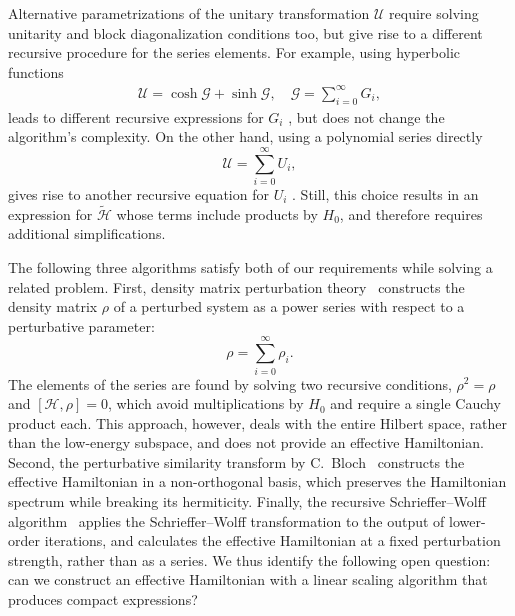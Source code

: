 Alternative parametrizations of the unitary transformation $\mathcal{U}$ require solving unitarity and block diagonalization conditions too, but give rise to a different recursive procedure for the series elements.
For example, using hyperbolic functions
%
\begin{gather}
\mathcal{U} = \cosh{\mathcal{G}} + \sinh{\mathcal{G}}, \quad
\mathcal{G} = \sum_{i=0}^{\infty} G_i,
\end{gather}
%
leads to different recursive expressions for $G_i$ \cite{Shavitt_1980}, but does not change the algorithm's complexity.
On the other hand, using a polynomial series directly
%
\begin{equation}
\mathcal{U} = \sum_{i=0}^{\infty} U_i,
\end{equation}
%
gives rise to another recursive equation for $U_i$ \cite{Van_Vleck_1929, Lowdin_1962, Klein_1974, Suzuki_1983}.
Still, this choice results in an expression for $\tilde{\mathcal{H}}$ whose terms include products by $H_0$, and therefore requires additional simplifications.

The following three algorithms satisfy both of our requirements while solving a related problem.
First, density matrix perturbation theory~\cite{McWeeny_1962,McWeeny_1968,Truflandier_2020} constructs the density
matrix $\mathcal{\rho}$ of a perturbed system as a power series with respect to a perturbative parameter:
%
\begin{equation}
  \mathcal{\rho} = \sum_{i=0}^{\infty} \rho_i.
\end{equation}
%
The elements of the series are found by solving two recursive conditions, $\mathcal{\rho}^2 = \mathcal{\rho}$ and $[\mathcal{H}, \mathcal{\rho}]=0$, which avoid multiplications by $H_0$ and require a single Cauchy product each.
This approach, however, deals with the entire Hilbert space, rather than the low-energy subspace, and does not provide an effective Hamiltonian.
Second, the perturbative similarity transform by C.~Bloch~\cite{Bloch_1958,Bravyi_2011} constructs the effective Hamiltonian in a non-orthogonal basis, which preserves the Hamiltonian spectrum while breaking its hermiticity.
Finally, the recursive Schrieffer--Wolff algorithm~\cite{Li_2022} applies the Schrieffer--Wolff transformation to the output of lower-order iterations, and calculates the effective Hamiltonian at a fixed perturbation strength, rather
than as a series.
We thus identify the following open question: can we construct an effective Hamiltonian with a linear scaling algorithm that produces compact expressions?

